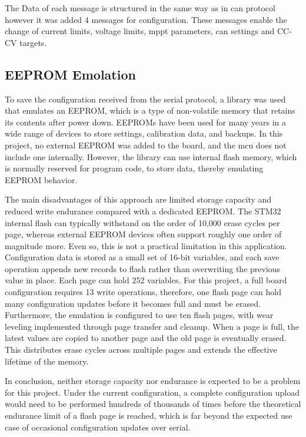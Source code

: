         The Data of each message is structured in the same way as in \ac{can} protocol however it was added 4 messages for configuration. These messages enable the change of current limits, voltage limits, \ac{mppt} parameters, \ac{can} settings and CC-CV targets.
        

    \subsection{EEPROM Emolation}
        To save the configuration received from the serial protocol, a library was used that emulates an EEPROM, which is a type of non-volatile memory that retains its contents after power down. EEPROMs have been used for many years in a wide range of devices to store settings, calibration data, and backups. In this project, no external EEPROM was added to the board, and the \ac{mcu} does not include one internally. However, the library can use internal flash memory, which is normally reserved for program code, to store data, thereby emulating EEPROM behavior.

        The main disadvantages of this approach are limited storage capacity and reduced write endurance compared with a dedicated EEPROM. The STM32 internal flash can typically withstand on the order of 10,000 erase cycles per page, whereas external EEPROM devices often support roughly one order of magnitude more. Even so, this is not a practical limitation in this application. Configuration data is stored as a small set of 16-bit variables, and each save operation appends new records to flash rather than overwriting the previous value in place. Each page can hold 252 variables. For this project, a full board configuration requires 13 write operations, therefore, one flash page can hold many configuration updates before it becomes full and must be erased. Furthermore, the emulation is configured to use ten flash pages, with wear leveling implemented through page transfer and cleanup. When a page is full, the latest values are copied to another page and the old page is eventually erased. This distributes erase cycles across multiple pages and extends the effective lifetime of the memory.

        In conclusion, neither storage capacity nor endurance is expected to be a problem for this project. Under the current configuration, a complete configuration upload would need to be performed hundreds of thousands of times before the theoretical endurance limit of a flash page is reached, which is far beyond the expected use case of occasional configuration updates over serial.

